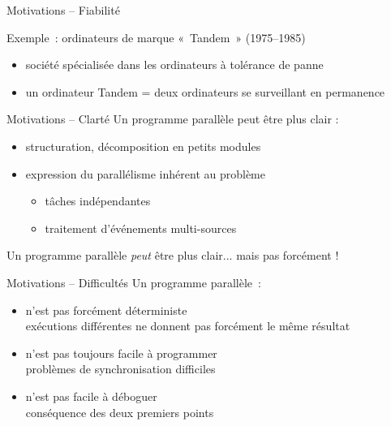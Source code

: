 \begin {frame} {Motivations -- Fiabilité}

    Exemple~: ordinateurs de marque «~Tandem~» (1975--1985)

    \begin {itemize}
	\item société spécialisée dans les ordinateurs à tolérance
	    de panne
	\item un ordinateur Tandem = deux ordinateurs se surveillant
	    en permanence

    \end {itemize}

\end {frame}

\begin {frame} {Motivations -- Clarté}
    Un programme parallèle peut être plus clair :

    \begin {itemize}
	\item structuration, décomposition en petits modules
	\item expression du parallélisme inhérent au problème
	    \begin {itemize}
		\item tâches indépendantes
		\item traitement d'événements multi-sources
	    \end {itemize}
    \end {itemize}

    Un programme parallèle \emph {peut} être plus clair...
    mais pas forcément !


\end {frame}

\begin {frame} {Motivations -- Difficultés}
    Un programme parallèle~:

    \begin {itemize}
	\item n'est pas forcément déterministe \\
	     exécutions différentes ne donnent pas
	    forcément le même résultat
	\item n'est pas toujours facile à programmer \\
	    \implique problèmes de synchronisation difficiles
	\item n'est pas facile à déboguer \\
	    \implique conséquence des deux premiers points
    \end {itemize}

\end {frame}

